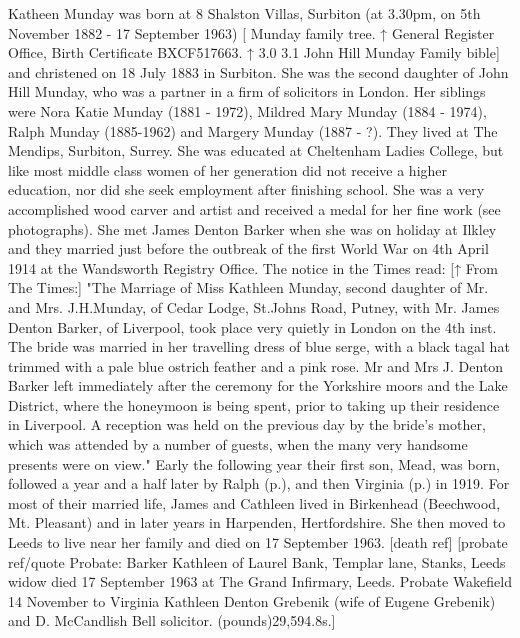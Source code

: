 
Katheen Munday  was born at 8 Shalston Villas, Surbiton (at 3.30pm, on 5th November 1882 - 17 September 1963) [ Munday family tree.  ↑ General Register Office, Birth Certificate BXCF517663. ↑ 3.0 3.1 John Hill Munday Family bible] and christened on 18 July 1883 in Surbiton.  She was the second daughter of John Hill Munday, who was a partner in a firm of solicitors in London. Her siblings were Nora Katie Munday (1881 - 1972), Mildred Mary Munday (1884 - 1974), Ralph Munday (1885-1962) and Margery Munday (1887 - ?). They lived at The Mendips, Surbiton, Surrey.  She was educated at Cheltenham Ladies College, but like most middle class women of her generation did not receive a higher education, nor did she seek employment after finishing school. She was a very accomplished wood carver and artist and received a medal for her fine work (see photographs). She met James Denton Barker when she was on holiday at Ilkley and they married just before the outbreak of the first World War on 4th April 1914 at the Wandsworth Registry Office. The notice in the Times read:
[↑ From The Times:]
"The Marriage of Miss Kathleen Munday, second daughter of Mr. and Mrs. J.H.Munday, of Cedar Lodge, St.Johns Road, Putney, with Mr. James Denton Barker, of Liverpool, took place very quietly in London on the 4th inst. The bride was married in her travelling dress of blue serge, with a black tagal hat trimmed with a pale blue ostrich feather and a pink rose. Mr and Mrs J. Denton Barker left immediately after the ceremony for the Yorkshire moors and the Lake District, where the honeymoon is being spent, prior to taking up their residence in Liverpool. A reception was held on the previous day by the bride's mother, which was attended by a number of guests, when the many very handsome presents were on view."
 Early the following year their first son, Mead, was born, followed a year and a half later by Ralph (p.\pageref{Ralph_Munday_Denton-Barker}), and then Virginia (p.\pageref{Virginia_Kathleen_Denton_Barker}) in 1919.
For most of their married life, James and Cathleen lived in Birkenhead (Beechwood, Mt. Pleasant) and in later years in Harpenden, Hertfordshire. She then moved to Leeds to live near her family and died on 17 September 1963. [death ref] [probate ref/quote  Probate: Barker Kathleen of Laurel Bank, Templar lane, Stanks, Leeds widow died 17 September 1963 at The Grand Infirmary, Leeds. Probate Wakefield 14 November to Virginia Kathleen Denton Grebenik (wife of Eugene Grebenik) and D. McCandlish Bell solicitor. (pounds)29,594.8s.]
